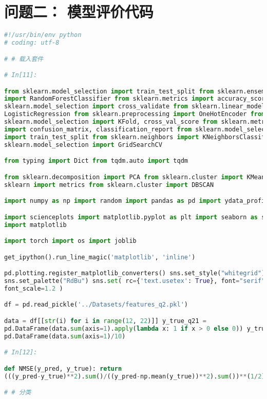 \documentclass[withoutpreface,bwprint]{cumcmthesis}
\begin{document}
\begin{appendices}
\begin{lstlisting}[language=Python]
    \end{lstlisting}

    \section{问题二： 模型评价代码}
    \begin{lstlisting}[language=Python]
#!/usr/bin/env python
# coding: utf-8

# # 载入套件

# In[11]:

from sklearn.model_selection import train_test_split from sklearn.ensemble
import RandomForestClassifier from sklearn.metrics import accuracy_score from
sklearn.model_selection import cross_validate from sklearn.linear_model import
LogisticRegression from sklearn.preprocessing import OneHotEncoder from
sklearn.model_selection import KFold, cross_val_score from sklearn.metrics
import confusion_matrix, classification_report from sklearn.model_selection
import train_test_split from sklearn.neighbors import KNeighborsClassifier from
sklearn.model_selection import GridSearchCV

from typing import Dict from tqdm.auto import tqdm

from sklearn.decomposition import PCA from sklearn.cluster import KMeans from
sklearn import metrics from sklearn.cluster import DBSCAN

import numpy as np import random import pandas as pd import ydata_profiling

import scienceplots import matplotlib.pyplot as plt import seaborn as sns
import matplotlib

import torch import os import joblib

get_ipython().run_line_magic('matplotlib', 'inline')

pd.plotting.register_matplotlib_converters() sns.set_style("whitegrid")
sns.set_palette("RdBu") sns.set( rc={'text.usetex': True}, font="serif",
font_scale=1.2 )

df = pd.read_pickle('../Datasets/features_q2.pkl')

data = df[[str(i) for i in range(12, 22)]] y_true_q21 =
pd.DataFrame(data.sum(axis=1).apply(lambda x: 1 if x > 0 else 0)) y_true_q22 =
pd.DataFrame(data.sum(axis=1)/10)

# In[12]:

def NMSE(y_pred, y_true): return
(((y_pred-y_true)**2).sum()/((y_pred-np.mean(y_true))**2).sum())**(1/2)

# # 分类


\end{lstlisting}
\end{appendices}
\end{document}
